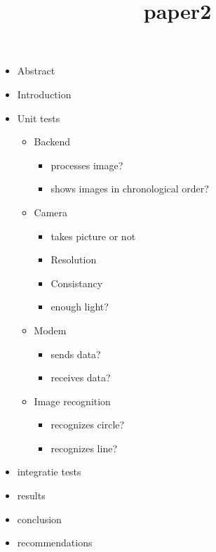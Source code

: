 \documentclass[conference]{IEEEtran}
\title{paper2}
\begin{document}
\maketitle
\begin{itemize}
	\item Abstract
	\item Introduction
	\item Unit tests
	\begin{itemize}
		\item Backend
		\begin{itemize}
			\item processes image?
			\item shows images in chronological order?
		\end{itemize}
		\item Camera
		\begin{itemize}
			\item takes picture or not
			\item Resolution
			\item Consistancy
			\item enough light?
		\end{itemize}
		\item Modem
		\begin{itemize}
			\item sends data?
			\item receives data?
		\end{itemize}
		\item Image recognition
		\begin{itemize}
			\item recognizes circle?
			\item recognizes line?
		\end{itemize}
	\end{itemize}
	\item integratie tests
	\item results
	\item conclusion
	\item recommendations
\end{itemize}
\end{document}
